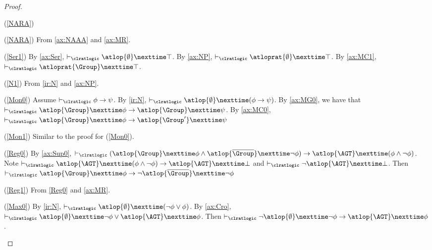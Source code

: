 \begin{proof}
  \begin{itemlist}{(\ref{NARA})}
      \item[(\ref{NARA})] From \ref{ax:NAAA} and \ref{ax:MR}.
      
      \item[(\ref{Ser1})] By \ref{ax:Ser}, $\vdash_{\clratlogic}\atlop{\emptyset }\nexttime \top$. By \ref{ax:NP}, $\vdash_{\clratlogic}\atloprat{\emptyset }\nexttime \top$. By \ref{ax:MC1}, $\vdash_{\clratlogic}\atloprat{\Group}\nexttime \top $.
      
      \item[(\ref{N1})] From \ref{ir:N} and \ref{ax:NP}.  
      
      \item[(\ref{Mon0})] Assume $\vdash_{\clratlogic} \phi \to \psi$. By \ref{ir:N}, $\vdash_{\clratlogic} \atlop{\emptyset }\nexttime (\phi \to \psi )$.   
      By \ref{ax:MG0}, we have that $\vdash_{\clratlogic} \atlop{\Group }\nexttime \phi \to \atlop{\Group }\nexttime \psi $. By \ref{ax:MC0}, $\vdash_{\clratlogic} \atlop{\Group }\nexttime \phi \to \atlop{\Group' }\nexttime \psi $
      
      \item[(\ref{Mon1})] Similar to the proof for (\ref{Mon0}).
      
      \item[(\ref{Reg0})] By \ref{ax:Sup0}, $\vdash_{\clratlogic}(\atlop{\Group }\nexttime \phi \wedge \atlop{\overline{\Group }}\nexttime \neg \phi ) \to \atlop{\AGT}\nexttime (\phi \wedge \neg \phi )$. Note $\vdash_{\clratlogic} \atlop{\AGT}\nexttime (\phi \wedge \neg \phi )\to \atlop{\AGT}\nexttime \bot $ and $\vdash_{\clratlogic} \neg \atlop{\AGT}\nexttime \bot $. Then $\vdash_{\clratlogic}\atlop{\Group }\nexttime \phi \to \neg \atlop{\overline{\Group }}\nexttime \neg \phi $
      
      \item[(\ref{Reg1})] From \ref{Reg0} and \ref{ax:MR}.
      
      \item[(\ref{Max0})] By \ref{ir:N}, $\vdash_{\clratlogic} \atlop{\emptyset }\nexttime (\neg \phi\vee \phi)$. By \ref{ax:Cro}, $\vdash_{\clratlogic} \atlop{\emptyset }\nexttime \neg \phi \vee \atlop{\AGT }\nexttime \phi $. Then $\vdash_{\clratlogic}\neg \atlop{\emptyset }\nexttime \neg \phi \to \atlop{\AGT}\nexttime \phi $.
      

\end{itemlist}
\end{proof}
